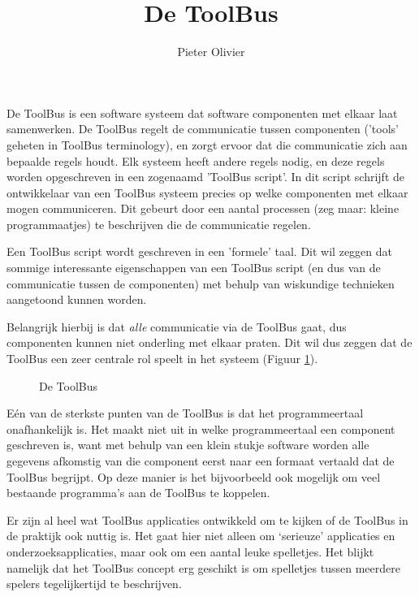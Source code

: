 
\title{De ToolBus}
\author{Pieter Olivier}

\maketitle

De ToolBus is een software systeem dat software componenten met
elkaar laat samenwerken. 
De ToolBus regelt de communicatie tussen componenten
('tools' geheten in ToolBus terminology),
en zorgt ervoor dat die communicatie zich aan bepaalde regels houdt.
Elk systeem heeft andere regels nodig, en deze regels worden opgeschreven
in een zogenaamd 'ToolBus script'. In dit script schrijft de ontwikkelaar
van een ToolBus systeem precies op welke componenten
met elkaar mogen communiceren. Dit gebeurt door een aantal processen
(zeg maar: kleine programmaatjes) te beschrijven die de communicatie
regelen.

Een ToolBus script wordt geschreven in
een 'formele' taal. Dit wil zeggen dat sommige interessante eigenschappen
van een ToolBus script (en dus van de communicatie tussen de componenten)
met behulp van wiskundige technieken aangetoond kunnen worden.

Belangrijk hierbij is dat \emph{alle} communicatie via de ToolBus
gaat, dus componenten kunnen niet onderling met elkaar praten.
Dit wil dus zeggen dat de ToolBus een zeer centrale rol speelt in
het systeem (Figuur \ref{toolbus}).

\begin{figure}[htb]
\centerline{}
\caption{De ToolBus}
\label{toolbus}
\end{figure}

E\'en van de sterkste punten van de ToolBus is dat het programmeertaal
onafhankelijk is. Het maakt niet uit in welke programmeertaal een component
geschreven is, want met behulp van een klein stukje software worden alle
gegevens afkomstig van die component eerst naar een formaat vertaald
dat de ToolBus begrijpt. Op deze manier is het bijvoorbeeld ook mogelijk
om veel bestaande programma's aan de ToolBus te koppelen.

Er zijn al heel wat ToolBus applicaties ontwikkeld om te kijken
of de ToolBus in de praktijk ook nuttig is. Het gaat hier niet alleen om 
`serieuze' applicaties en onderzoeksapplicaties, maar ook om een aantal
leuke spelletjes. Het blijkt namelijk dat het ToolBus concept erg
geschikt is om spelletjes tussen meerdere spelers tegelijkertijd te
beschrijven.


